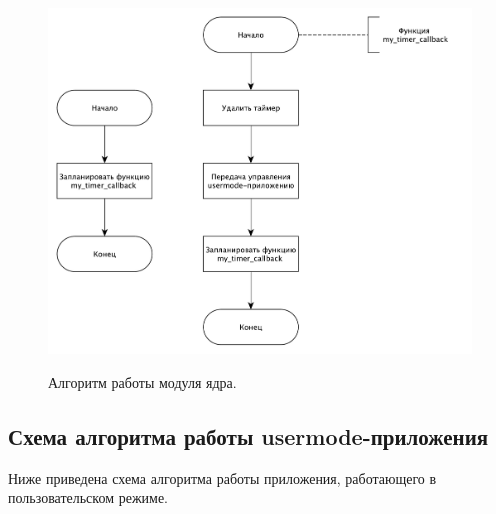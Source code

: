 \documentclass[a4paper,14pt]{extarticle}
\begin{document}
 	\begin{figure}[h!]
 		\begin{center}
 			{\includegraphics[scale = 0.6]{img/theme_kernel.pdf}}
 			\label{ris:theme_kernel}
 		\end{center}
 		\caption{Алгоритм работы модуля ядра.}
 	\end{figure}
 	
 	\subsection{Схема алгоритма работы usermode-приложения}
 	
 	Ниже приведена схема алгоритма работы приложения, работающего в пользовательском режиме.
 	
\end{document}
